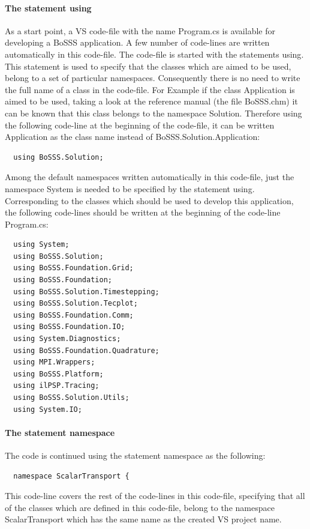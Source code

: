 \documentclass[11pt,twoside,a4paper]{fdyartcl}
\begin{document}
\paragraph{The statement {\scriptsize using}} As a start point, a VS code-file with the name {\scriptsize Program.cs} is available for developing a BoSSS application. A few number of code-lines are written automatically in this code-file. The code-file is started with the statements {\scriptsize using}. This statement is used to specify that the classes which are aimed to be used, belong to a set of particular namespaces. Consequently there is no need to write the full name of a class in the code-file. For Example if the class {\scriptsize Application} is aimed to be used, taking a look at the reference manual (the file {\scriptsize BoSSS.chm}) it can be known that this class belongs to the namespace {\scriptsize Solution}. Therefore using the following code-line at the beginning of the code-file, it can be written {\scriptsize Application} as the class name instead of {\scriptsize BoSSS.Solution.Application}:
{\scriptsize \begin{verbatim}
  using BoSSS.Solution;
\end{verbatim}}
Among the default namespaces written automatically in this code-file, just the namespace {\scriptsize System} is needed to be specified by the statement {\scriptsize using}. Corresponding to the classes which should be used to develop this application, the following code-lines should be written at the beginning of the code-line {\scriptsize Program.cs}:
{\scriptsize \begin{verbatim}
  using System;
  using BoSSS.Solution;
  using BoSSS.Foundation.Grid;
  using BoSSS.Foundation;
  using BoSSS.Solution.Timestepping;
  using BoSSS.Solution.Tecplot;
  using BoSSS.Foundation.Comm;
  using BoSSS.Foundation.IO;
  using System.Diagnostics;
  using BoSSS.Foundation.Quadrature;
  using MPI.Wrappers;
  using BoSSS.Platform;
  using ilPSP.Tracing;
  using BoSSS.Solution.Utils;
  using System.IO;

\end{verbatim}}
\paragraph{The statement {\scriptsize namespace}} The code is continued using the statement {\scriptsize namespace} as the following:
{\scriptsize \begin{verbatim}
  namespace ScalarTransport {
\end{verbatim}}
This code-line covers the rest of the code-lines in this code-file, specifying that all of the classes which are defined in this code-file, belong to the namespace {\scriptsize ScalarTransport} which has the same name as the created VS project name.
\end{document}
